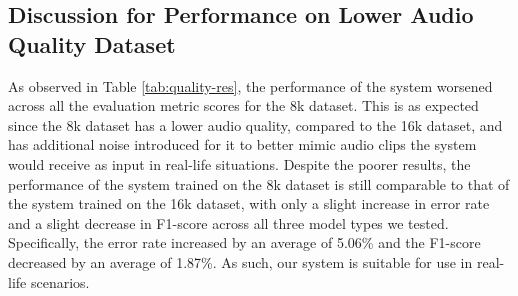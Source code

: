 
\subsection{Discussion for Performance on Lower Audio Quality Dataset}
As observed in Table \ref{tab:quality-res}, the performance of the system worsened across all the evaluation metric scores for the 8k dataset. This is as expected since the 8k dataset has a lower audio quality, compared to the 16k dataset, and has additional noise introduced for it to better mimic audio clips the system would receive as input in real-life situations. Despite the poorer results, the performance of the system trained on the 8k dataset is still comparable to that of the system trained on the 16k dataset, with only a slight increase in error rate and a slight decrease in F1-score across all three model types we tested. Specifically, the error rate increased by an average of 5.06\% and the F1-score decreased by an average of 1.87\%. As such, our system is suitable for use in real-life scenarios.

